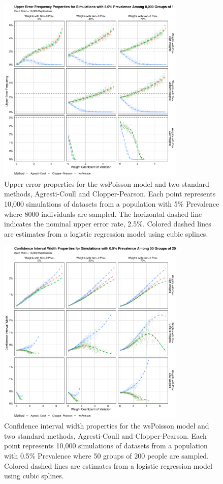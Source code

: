 \documentclass[AMA,STIX1COL]{WileyNJD-v2}
\begin{document}
\begin{figure}
\centering
\includegraphics[width=0.8\textwidth]{figures/perfect_upper_error_frequency_8000_groups_0_05_prev.pdf}
\caption{Upper error properties for the wsPoisson model and two standard methods, Agresti-Coull and Clopper-Pearson.
Each point represents 10,000 simulations of datasets from a population with 5\% Prevalence where 8000 individuals are sampled.
The horizontal dashed line indicates the nominal upper error rate, 2.5\%.
Colored dashed lines are estimates from a logistic regression model using cubic splines.}
\label{fig:perfect_upper_error_frequency_8000_groups_0_05_prev}
\end{figure}

\begin{figure}
\centering
\includegraphics[width=0.8\textwidth]{figures/perfect_confidence_interval_width_50_groups_0_005_prev}
\caption{Confidence interval width properties for the wsPoisson model and two standard methods, Agresti-Coull and Clopper-Pearson.
Each point represents 10,000 simulations of datasets from a population with 0.5\% Prevalence where 50 groups of 200 people are sampled.
Colored dashed lines are estimates from a logistic regression model using cubic splines.}
\label{fig:perfect_confidence_interval_width_50_groups_0_005_prev}
\end{figure}
\end{document}
